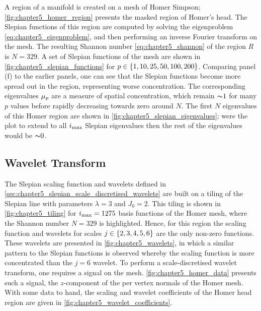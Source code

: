 A region of a manifold is created on a mesh of Homer Simpson; \cref{fig:chapter5_homer_region} presents the masked region of Homer's head.
The Slepian functions of this region are computed by solving the eigenproblem \cref{eq:chapter5_eigenproblem}, and then performing an inverse Fourier transform on the mesh.
The resulting Shannon number \cref{eq:chapter5_shannon} of the region \(R\) is \(N=329\).
A set of Slepian functions of the mesh are shown in \cref{fig:chapter5_slepian_functions} for \(p \in \{1, 10, 25, 50, 100, 200\}\).
Comparing panel (f) to the earlier panels, one can see that the Slepian functions become more spread out in the region, representing worse concentration.
The corresponding eigenvalues \({\mu}_{p}\) are a measure of spatial concentration, which remain \({\thicksim}1\) for many \(p\) values before rapidly decreasing towards zero around \(N\).
The first \(N\) eigenvalues of this Homer region are shown in \cref{fig:chapter5_slepian_eigenvalues}; were the plot to extend to all \(i_{\text{max}}{}\) Slepian eigenvalues then the rest of the eigenvalues would be \({\thicksim}0\).







\subsection{Wavelet Transform}\label{sec:chapter5_wavelet_transform}

The Slepian scaling function and wavelets defined in \cref{sec:chapter5_slepian_scale_discretised_wavelets} are built on a tiling of the Slepian line with parameters \(\lambda=3\) and \(J_{0}=2\).
This tiling is shown in \cref{fig:chapter5_tiling} for \(i_{\text{max}}=\num{1275}\) basis functions of the Homer mesh, where the Shannon number \(N=329\) is highlighted.
Hence, for this region the scaling function and wavelets for scales \(j \in \{2, 3, 4, 5, 6\}\) are the only non-zero functions.
These wavelets are presented in \cref{fig:chapter5_wavelets}, in which a similar pattern to the Slepian functions is observed whereby the scaling function is more concentrated than the \(j=6\) wavelet.
To perform a scale-discretised wavelet transform, one requires a signal on the mesh.
\cref{fig:chapter5_homer_data} presents such a signal, the \(z\)-component of the per vertex normals of the Homer mesh.
With some data to hand, the scaling and wavelet coefficients of the Homer head region are given in \cref{fig:chapter5_wavelet_coefficients}.


